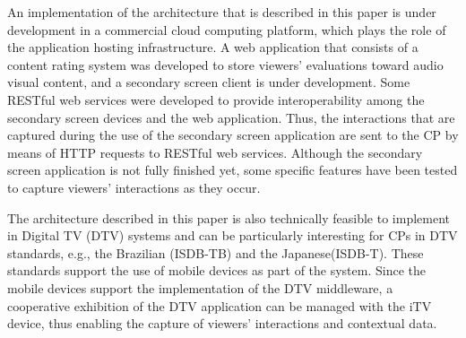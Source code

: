 \documentclass[journal]{IEEEtran}
\begin{document}
An implementation of the architecture that is described in this paper is under development in a commercial cloud computing platform, which plays the role of the application hosting infrastructure. A web application that consists of a content rating system was developed to store  viewers' evaluations toward audio visual content, and a secondary screen client is under development. Some RESTful web services were developed to provide interoperability among the secondary screen devices and the web application. Thus, the interactions that are captured during the use of the secondary screen application are sent to the CP by means of HTTP requests to RESTful web services. Although the secondary screen application is not fully finished yet, some specific features have been tested to capture viewers' interactions as they occur.

The architecture described in this paper is also technically feasible to implement in Digital TV (DTV) systems and can be particularly interesting for CPs in DTV standards, e.g., the Brazilian (ISDB-TB) and the Japanese(ISDB-T). These standards support the use of mobile devices as part of the system. Since the mobile devices support the implementation of the DTV middleware, a cooperative exhibition of the DTV application can be managed with the iTV device, thus enabling the capture of viewers' interactions and contextual data.



\end{document}
